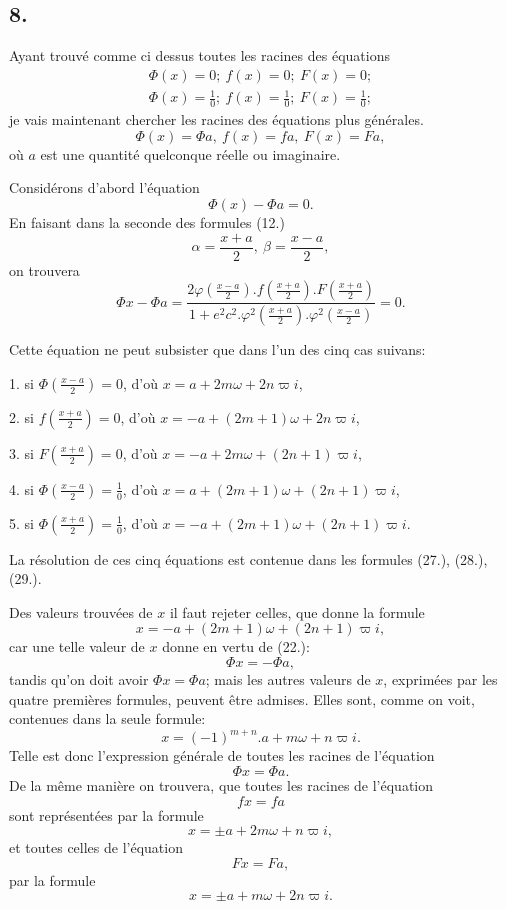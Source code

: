 \documentclass{article}
\begin{document}
\subsection*{8.}

Ayant trouvé comme ci dessus toutes les racines des équations
\[ \begin{gathered} \Phi(x)=0;\ f(x)=0;\ F(x)=0;\\ \Phi(x)=\frac{1}{0};\ f(x)=\frac{1}{0};\ F(x)=\frac{1}{0}; \end{gathered} \]
je vais maintenant chercher les racines des équations plus générales.
\[ \Phi(x)=\Phi a,\ f(x)=fa,\ F(x)=Fa, \]
où $a$ est une quantité quelconque réelle ou imaginaire.

Considérons d'abord l'équation
\[ \Phi(x)-\Phi a=0. \]
En faisant dans la seconde des formules (12.)
\[ \alpha=\frac{x+a}{2},\ \beta=\frac{x-a}{2}, \]
on trouvera
\[ \Phi x-\Phi a=\frac{2\varphi\left(\frac{x-a}{2}\right).f\left(\frac{x+a}{2}\right).F\left(\frac{x+a}{2}\right)}{1+e^{2}c^{2}.\varphi^{2}\left(\frac{x+a}{2}\right).\varphi^{2}\left(\frac{x-a}{2}\right)}=0. \]

Cette équation ne peut subsister que dans l'un des cinq cas suivans:

1. si $\Phi\left(\frac{x-a}{2}\right)=0$, d'où $x=a+2m\omega+2n\varpi i$,

2. si $f\left(\frac{x+a}{2}\right)=0$, d'où $x=-a+(2m+1)\omega+2n\varpi i$,

3. si $F\left(\frac{x+a}{2}\right)=0$, d'où $x=-a+2m\omega+(2n+1)\varpi i$,

4. si $\Phi\left(\frac{x-a}{2}\right)=\frac{1}{0}$, d'où $x=a+(2m+1)\omega+(2n+1)\varpi i$,

5. si $\Phi\left(\frac{x+a}{2}\right)=\frac{1}{0}$, d'où $x=-a+(2m+1)\omega+(2n+1)\varpi i$.

La résolution de ces cinq équations est contenue dans les formules (27.), (28.), (29.).

Des valeurs trouvées de $x$ il faut rejeter celles, que donne la formule
\[ x=-a+(2m+1)\omega+(2n+1)\varpi i, \]
car une telle valeur de $x$ donne en vertu de (22.):
\[ \Phi x=-\Phi a, \]
tandis qu'on doit avoir $\Phi x=\Phi a$; mais les autres valeurs de $x$, exprimées par les quatre premières formules, peuvent être admises. Elles sont, comme on voit, contenues dans la seule formule:
\[ x=(-1)^{m+n}.a+m\omega+n\varpi i. \tag{31.} \]
Telle est donc l'expression générale de toutes les racines de l'équation
\[ \Phi x=\Phi a. \]
De la même manière on trouvera, que toutes les racines de l'équation
\[ fx=fa \]
sont représentées par la formule
\[ x=\pm a+2m\omega+n\varpi i, \tag{32.} \]
et toutes celles de l'équation
\[ Fx=Fa, \]
par la formule
\[ x=\pm a+m\omega+2n\varpi i. \tag{33.} \]
\end{document}
